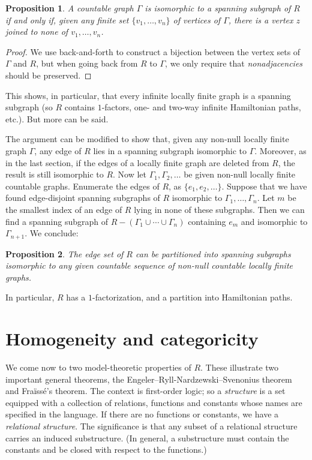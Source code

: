 \documentclass{book}
\newtheorem{proposition}{Proposition}
\begin{document}
\begin{proposition}\label{ch32:prop4.2} 
A countable graph $\Gamma$ is isomorphic to a
spanning subgraph of $R$ if and only if, given any finite set
$\{v_1, \ldots, v_n\}$ of vertices of $\Gamma$, there is a vertex
$z$ joined to none of $v_1, \ldots, v_n$.
\end{proposition}
\begin{proof}
We use back-and-forth to construct a bijection
between the vertex sets of $\Gamma$ and $R$, but when going back
from $R$ to $\Gamma$, we only require that \emph{nonadjacencies}
should be preserved.
\end{proof}

This shows, in particular, that every infinite locally finite graph
is a spanning subgraph (so $R$ contains $1$-factors, one- and two-way
infinite Hamiltonian paths, etc.). But more can be said.

The argument can be modified to show that, given any non-null
locally finite graph $\Gamma$, any edge of $R$ lies in a spanning
subgraph isomorphic to $\Gamma$. Moreover, as in the last section,
if the edges of a locally finite graph are deleted from $R$, the
result is still isomorphic to $R$. Now let $\Gamma_1,
\Gamma_2,\ldots$ be given non-null locally finite countable graphs.
Enumerate the edges of $R$, as $\{e_1,e_2,\ldots\}$. Suppose that
we have found edge-disjoint spanning subgraphs of $R$ isomorphic to
$\Gamma_1,\ldots,\Gamma_n$. Let $m$ be the smallest index of an edge
of $R$ lying in none of these subgraphs. Then we can find a spanning
subgraph of $R - (\Gamma_1 \cup\cdots\cup\Gamma_n)$ containing $e_m$
and isomorphic to $\Gamma_{n +1}$. We conclude:

\begin{proposition}\label{ch32:prop4.3} 
The edge set of $R$ can be partitioned into
spanning subgraphs isomorphic to any given countable sequence of
non-null countable locally finite graphs.
\end{proposition}

In particular, $R$ has a $1$-factorization, and a partition into
Hamiltonian paths.

\section{Homogeneity and categoricity}%
\label{ch32:sec2.5}

We come now to two model-theoretic properties of $R$. These
illustrate two important general theorems, the
Engeler--Ryll-Nardzewski--Svenonius theorem and Fra\"{i}ss\'{e}'s
theorem. The context is first-order logic; so a \emph{structure}
is a set equipped with a collection of relations, functions and
constants whose names are specified in the language. If there are no
functions or constants, we have a \emph{relational structure}. The
significance is that any subset of a relational structure carries an
induced substructure. (In general, a substructure must contain the
constants and be closed with respect to the functions.)
\end{document}
